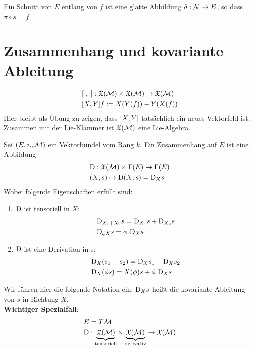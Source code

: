 \begin{defs}
Ein Schnitt von $E$ entlang von $f$ ist eine glatte Abbildung $\delta : \mathcal{N} \to E$, so dass $\pi \circ s = f$. 
\end{defs}

\section{Zusammenhang und kovariante Ableitung}

\begin{defs}
\begin{align}
&\comm{\cdot}{\cdot} : \mathfrak{X}(\mfk) \times \mathfrak{X}(\mfk) \to \mathfrak{X}(\mfk)\\
&\comm{X}{Y} f := X(Y(f)) - Y(X(f))
\end{align}
Hier bleibt als Übung zu zeigen, dass $\comm{X}{Y}$ tatsächlich ein neues Vektorfeld ist.\\
Zusammen mit der Lie-Klammer ist $\mathfrak{X}(\mathcal{M})$ eine Lie-Algebra.
\end{defs}

\begin{defs}[Zusammenhang]
Sei $(E, \uppi, \mathcal{M})$ ein Vektorbündel vom Rang $k$.
Ein Zusammenhang auf $E$ ist eine Abbildung
\begin{align}
&\mathrm{D} : \mathfrak{X}(\mathcal{M}) \times \Gamma(E) \to \Gamma (E) \\
&(X, s) \mapsto \mathrm{D} (X, s) = \mathrm{D}_X s
\end{align}
Wobei folgende Eigenschaften erfüllt sind:
\begin{enumerate}
\item $\mathrm{D}$ ist tensoriell in $X$: 
\begin{align}
&\mathrm{D}_{X_1 + X_2} s = \mathrm{D}_{X_1} s + \mathrm{D}_{X_2} s \\
&\mathrm{D}_{\phi X} s = \phi \ \mathrm{D}_X s
\end{align}
\item $\mathrm{D}$ ist eine Derivation in s:
\begin{align}
&\mathrm{D}_X (s_1 + s_2) = \mathrm{D}_X s_1 + \mathrm{D}_X s_2\\
&\mathrm{D}_X (\phi s) = X (\phi) s + \phi \ \mathrm{D}_X  s
\end{align}
\end{enumerate}
\end{defs}

Wir führen hier die folgende Notation ein:
$\mathrm{D}_X s$ heißt die kovariante Ableitung von $s$ in Richtung $X$.\\
\textbf{Wichtiger Spezialfall}:
\begin{align}
&E = T\mathcal{M}\\
&\mathrm{D}: \underbrace{\mathfrak{X}(\mathcal{M})}_{\mathrm{tensoriell}} \times \underbrace{\mathfrak{X}(\mathcal{M})}_{\mathrm{derivativ}} \to \mathfrak{X}(\mathcal{M})
\end{align}

